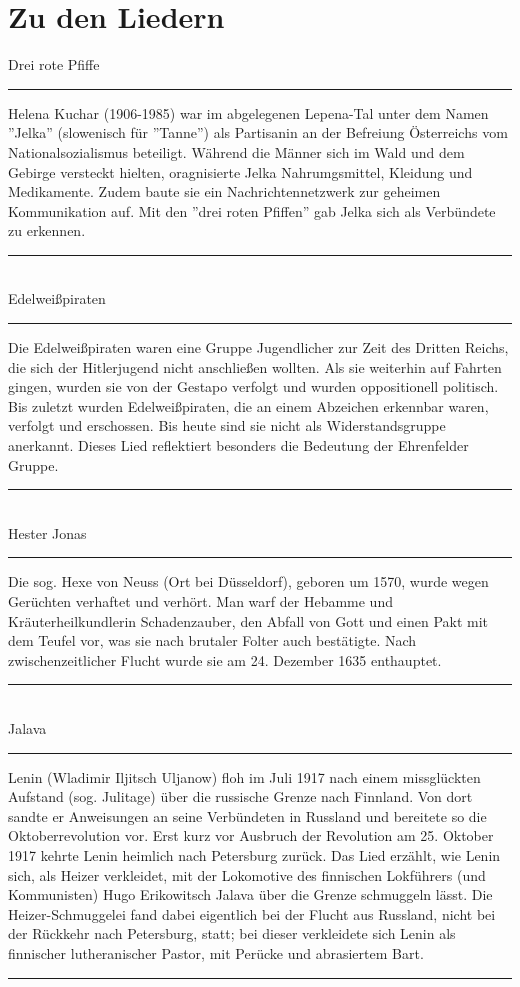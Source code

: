 \section*{Zu den Liedern}


Drei rote Pfiffe\\[-0.5em]
\noindent\rule{\textwidth}{0.2pt}
Helena Kuchar (1906-1985) war im abgelegenen Lepena-Tal unter dem Namen ''Jelka'' (slowenisch für ''Tanne'') als Partisanin an der Befreiung Österreichs vom Nationalsozialismus beteiligt.
Während die Männer sich im Wald und dem Gebirge versteckt hielten, oragnisierte Jelka Nahrumgsmittel, Kleidung und Medikamente.
Zudem baute sie ein Nachrichtennetzwerk zur geheimen Kommunikation auf. Mit den ''drei roten Pfiffen'' gab Jelka sich als Verbündete zu erkennen. \\[-0.5em]
\noindent\rule{\textwidth}{0.2pt} \\

Edelweißpiraten\\[-0.5em]
\noindent\rule{\textwidth}{0.2pt}
Die Edelweißpiraten waren eine Gruppe Jugendlicher zur Zeit des Dritten Reichs, die sich der Hitlerjugend nicht anschließen wollten.
Als sie weiterhin auf Fahrten gingen, wurden sie von der Gestapo verfolgt und wurden oppositionell politisch.
Bis zuletzt wurden Edelweißpiraten, die an einem Abzeichen erkennbar waren, verfolgt und erschossen.
Bis heute sind sie nicht als Widerstandsgruppe anerkannt. Dieses Lied reflektiert besonders die Bedeutung der Ehrenfelder Gruppe. \\[-0.5em]
\noindent\rule{\textwidth}{0.2pt} \\

Hester Jonas\\[-0.5em]
\noindent\rule{\textwidth}{0.2pt}
Die sog. Hexe von Neuss (Ort bei Düsseldorf), geboren um 1570, wurde wegen Gerüchten verhaftet und verhört.
Man warf der Hebamme und Kräuterheilkundlerin Schadenzauber, den Abfall von Gott und einen Pakt mit dem Teufel vor, was sie nach brutaler Folter auch bestätigte.
Nach zwischenzeitlicher Flucht wurde sie am 24. Dezember 1635 enthauptet. \\[-0.5em]
\noindent\rule{\textwidth}{0.2pt} \\

Jalava\\[-0.5em]
\noindent\rule{\textwidth}{0.2pt}
Lenin (Wladimir Iljitsch Uljanow) floh im Juli 1917 nach einem missglückten Aufstand (sog. Julitage) über die russische Grenze nach Finnland.
Von dort sandte er Anweisungen an seine Verbündeten in Russland und bereitete so die Oktoberrevolution vor.
Erst kurz vor Ausbruch der Revolution am 25. Oktober 1917 kehrte Lenin heimlich nach Petersburg zurück.
Das Lied erzählt, wie Lenin sich, als Heizer verkleidet, mit der Lokomotive des finnischen Lokführers (und Kommunisten) Hugo Erikowitsch Jalava über die Grenze schmuggeln lässt.
Die Heizer-Schmuggelei fand dabei eigentlich bei der Flucht aus Russland, nicht bei der Rückkehr nach Petersburg, statt; bei dieser verkleidete sich Lenin als finnischer lutheranischer Pastor, mit Perücke und abrasiertem Bart. \\[-0.5em]
\noindent\rule{\textwidth}{0.2pt}
